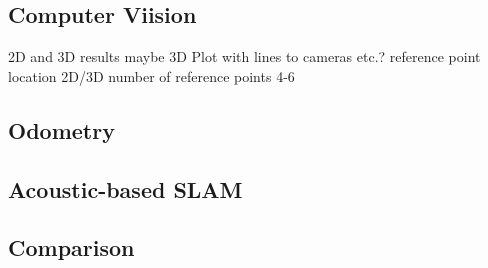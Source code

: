 \subsection{Computer Viision}
2D and 3D results
maybe 3D Plot with lines to cameras etc.? 
reference point location 2D/3D
number of reference points 4-6

\subsection{Odometry}
\subsection{Acoustic-based SLAM}

\subsection{Comparison}


